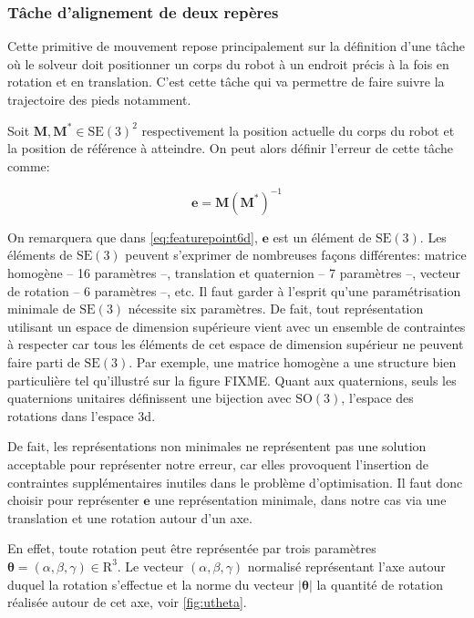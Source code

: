 \subsubsection{Tâche d'alignement de deux repères}

Cette primitive de mouvement repose principalement sur la définition
d'une tâche où le solveur doit positionner un corps du robot à un
endroit précis à la fois en rotation et en translation. C'est cette
tâche qui va permettre de faire suivre la trajectoire des pieds
notamment.


Soit $\mathbf{M}, \mathbf{M}^{*} \in \text{SE}(3)^2$
respectivement la position actuelle du corps du robot et la position
de référence à atteindre. On peut alors définir l'erreur de cette
tâche comme:

\begin{equation}\label{eq:featurepoint6d}
  \mathbf{e} = \mathbf{M} (\mathbf{M}^{*})^{-1}
\end{equation}

On remarquera que dans \autoref{eq:featurepoint6d}, $\mathbf{e}$ est
un élément de $\text{SE}(3)$. Les éléments de $\text{SE}(3)$ peuvent
s'exprimer de nombreuses façons différentes: matrice homogène -- 16
paramètres --, translation et quaternion -- 7 paramètres --, vecteur
de rotation -- 6 paramètres --, etc. Il faut garder à l'esprit qu'une
paramétrisation minimale de $\text{SE}(3)$ nécessite six
paramètres. De fait, tout représentation utilisant un espace de
dimension supérieure vient avec un ensemble de contraintes à respecter
car tous les éléments de cet espace de dimension supérieur ne peuvent
faire parti de $\text{SE}(3)$. Par exemple, une matrice homogène a une
structure bien particulière tel qu'illustré sur la figure FIXME. Quant
aux quaternions, seuls les quaternions unitaires définissent une
bijection avec $\text{SO}(3)$, l'espace des rotations dans l'espace
3d.

De fait, les représentations non minimales ne représentent pas une
solution acceptable pour représenter notre erreur, car elles provoquent
l'insertion de contraintes supplémentaires inutiles dans le problème
d'optimisation. Il faut donc choisir pour représenter $\mathbf{e}$ une
représentation minimale, dans notre cas via une translation et une
rotation autour d'un axe.

En effet, toute rotation peut être représentée par trois paramètres
\mbox{$\mathbf{\theta} = (\alpha, \beta, \gamma) \in \mathrm{R}^3$}. Le
vecteur $(\alpha, \beta, \gamma)$ normalisé représentant l'axe autour
duquel la rotation s'effectue et la norme du vecteur
$|\mathbf{\theta}|$ la quantité de rotation réalisée autour de cet
axe, voir \autoref{fig:utheta}.

